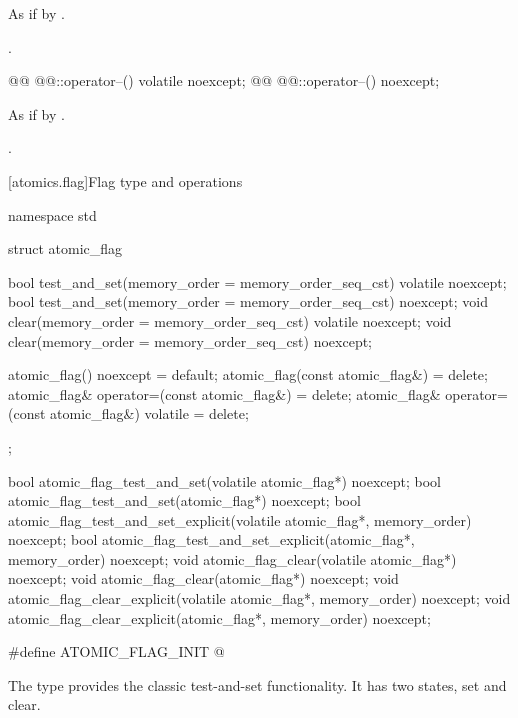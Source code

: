 \begin{itemdescr}
\pnum
\effects As if by .

\pnum
\returns {}.
\end{itemdescr}

%
%
\begin{itemdecl}
@@ @@::operator--() volatile noexcept;
@@ @@::operator--() noexcept;
\end{itemdecl}

\begin{itemdescr}
\pnum
\effects As if by .

\pnum
\returns {}.
\end{itemdescr}

[atomics.flag]{Flag type and operations}

\begin{codeblock}
namespace std {
  struct atomic_flag {
    bool test_and_set(memory_order = memory_order_seq_cst) volatile noexcept;
    bool test_and_set(memory_order = memory_order_seq_cst) noexcept;
    void clear(memory_order = memory_order_seq_cst) volatile noexcept;
    void clear(memory_order = memory_order_seq_cst) noexcept;

    atomic_flag() noexcept = default;
    atomic_flag(const atomic_flag&) = delete;
    atomic_flag& operator=(const atomic_flag&) = delete;
    atomic_flag& operator=(const atomic_flag&) volatile = delete;
  };

  bool atomic_flag_test_and_set(volatile atomic_flag*) noexcept;
  bool atomic_flag_test_and_set(atomic_flag*) noexcept;
  bool atomic_flag_test_and_set_explicit(volatile atomic_flag*, memory_order) noexcept;
  bool atomic_flag_test_and_set_explicit(atomic_flag*, memory_order) noexcept;
  void atomic_flag_clear(volatile atomic_flag*) noexcept;
  void atomic_flag_clear(atomic_flag*) noexcept;
  void atomic_flag_clear_explicit(volatile atomic_flag*, memory_order) noexcept;
  void atomic_flag_clear_explicit(atomic_flag*, memory_order) noexcept;

  #define ATOMIC_FLAG_INIT @\seebelow@
}
\end{codeblock}

\pnum
The  type provides the classic test-and-set functionality. It has two states, set and clear.

